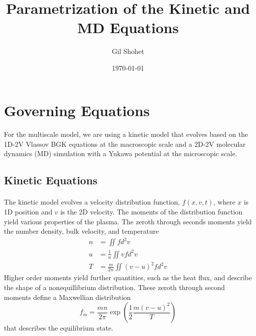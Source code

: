 \documentclass[11pt]{article}
\begin{document}
	
	\begin{spacing}{0.5}
		\title{Parametrization of the Kinetic and MD Equations}
		\author{\normalsize{Gil Shohet}} 
		\date{\normalsize\today}
		\maketitle
	\end{spacing}
	
\section*{Governing Equations}
\paragraph{}
For the multiscale model, we are using a kinetic model that evolves based on the 1D-2V Vlassov BGK equations at the macroscopic scale and a 2D-2V molecular dynamics (MD) simulation with a Yukawa potential at the microscopic scale.

\subsection*{Kinetic Equations}
\paragraph{}
The kinetic model evolves a velocity distribution function, $f(x,v,t)$, where $x$ is 1D position and $v$ is the 2D velocity. The moments of the distribution function yield various properties of the plasma. The zeroth through seconds moments yield the number density, bulk velocity, and temperature
\begin{align*}
n &= \iint f d^2v \\
u &= \frac{1}{n}\iint v f d^2v \\
T &= \frac{m}{2n}\iint (v-u)^2 f d^2v
\end{align*}
Higher order moments yield further quantities, such as the heat flux, and describe the shape of a nonequillibrium distribution. These zeroth through second moments define a Maxwellian distribution 
\begin{equation*}
f_m = \frac{mn}{2\pi}\exp\left(\frac{1}{2}\frac{m(v-u)^2}{T}\right)
\end{equation*}
that describes the equilibrium state.
\end{document}
